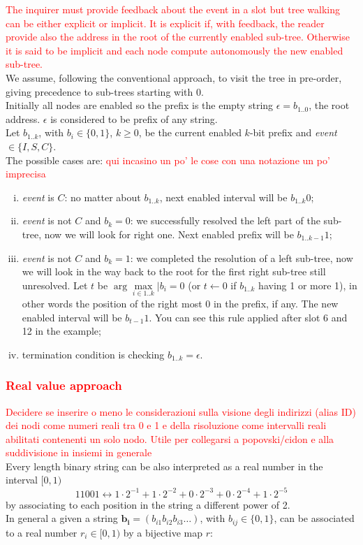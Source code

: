 \documentclass[12pt,a4paper,twocolumns]{report}
\begin{document}
\textcolor{red}{
The inquirer must provide feedback about the event in a slot but tree walking can be either explicit or implicit. It is explicit if, with feedback, the reader provide also the address in the root of the currently enabled sub-tree. Otherwise it is said to be implicit and each node compute autonomously the new enabled sub-tree.}\\
We assume, following the conventional approach, to visit the tree in pre-order, giving precedence to sub-trees starting with 0.\\
Initially all nodes are enabled so the prefix is the empty string $\epsilon=b_{1..0}$, the root address. $\epsilon$ is considered to be prefix of any string.\\
Let $b_{1..k}$, with $b_{i} \in \{0,1\}$, $k \geq0$, be the current enabled $k$-bit prefix and \emph{event} $\in \{I,S,C\}$.\\
The possible cases are: \textcolor{red}{qui incasino un po' le cose con una notazione un po' imprecisa}
\begin{enumerate}[i.]
\item \emph{event} is $C$: no matter about $b_{1..k}$, next enabled interval will be $b_{1..k}0$;
\item \emph{event} is not $C$ and $b_{k}=0$: we successfully resolved the left part of the sub-tree, now we will look for right one. Next enabled prefix will be $b_{1..k-1}1$;
\item \emph{event} is not $C$ and $b_{k}=1$: we completed the  resolution of a left sub-tree, now we will look in the way back to the root for the first right sub-tree still unresolved. Let $t$ be $ \arg\underset{i \in 1..k}{\max}|b_{i}=0$ (or $t\gets 0$ if $b_{1..k}$ having 1 or more 1), in other words the position of the right most 0 in the prefix, if any. The new enabled interval will be $b_{t-1}1$. You can see this rule applied after slot 6 and 12 in the example;
\item termination condition is checking $b_{1..k}=\epsilon$.
\end{enumerate}

\subsubsection{\textcolor{red}{Real value approach}}
\textcolor{red}{Decidere se inserire o meno le considerazioni sulla visione degli indirizzi (alias ID) dei nodi come numeri reali tra 0 e 1 e della risoluzione come intervalli reali abilitati contenenti un solo nodo. Utile per collegarsi a popovski/cidon e alla suddivisione in insiemi in generale}\\
Every length binary string can be also interpreted as a real number in the interval $[0,1)$
\begin{equation*}
11001 \leftrightarrow 1 \cdot 2^{-1} + 1 \cdot 2^{-2} + 0 \cdot 2^{-3} + 0 \cdot 2^{-4} +1 \cdot 2^{-5} 
\end{equation*}
by associating to each position in the string a different power of 2.\\
In general a given a string $\mathbf{b_{i}}=(b_{i1}b_{i2}b_{i3}\ldots)$, with $b_{ij} \in \{0,1\}$, can be associated to a real number $r_{i} \in [0,1)$ by a bijective map $r$:\\
\end{document}
